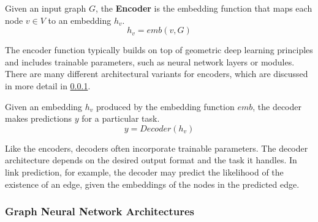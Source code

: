 \begin{definition}
    \label{d_Encoder}
    Given an input graph $G$, the \textbf{Encoder} is the embedding function that maps each node $v \in V$ to an embedding $h_v$.
    \begin{equation}
        h_v = emb(v, G)
    \end{equation}
\end{definition}

The encoder function typically builds on top of geometric deep learning principles and includes trainable parameters, such as neural network layers or modules. There are many different architectural variants for encoders, which are discussed in more detail in \ref{s_Background_GNNs_GNNArchtectures}. 

\begin{definition}
    \label{d_Decoder}
    Given an embedding $h_v$ produced by the embedding function $emb$, the decoder makes predictions $y$ for a particular task.
    \begin{equation}
        y = Decoder(h_v)
    \end{equation}
\end{definition}

Like the encoders, decoders often incorporate trainable parameters. The decoder architecture depends on the desired output format and the task it handles. In link prediction, for example, the decoder may predict the likelihood of the existence of an edge, given the embeddings of the nodes in the predicted edge.

\subsubsection{Graph Neural Network Architectures}
\label{s_Background_GNNs_GNNArchtectures}

